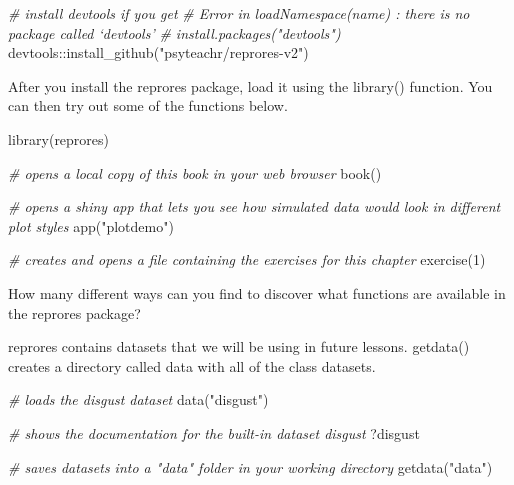 \documentclass[
  oneside]{book}
\newenvironment{Shaded}{\begin{snugshade}}{\end{snugshade}}
\newcommand{\CommentTok}[1]{\textcolor[rgb]{0.56,0.35,0.01}{\textit{#1}}}
\newcommand{\DecValTok}[1]{\textcolor[rgb]{0.00,0.00,0.81}{#1}}
\newcommand{\FunctionTok}[1]{\textcolor[rgb]{0.00,0.00,0.00}{#1}}
\newcommand{\NormalTok}[1]{#1}
\newcommand{\SpecialCharTok}[1]{\textcolor[rgb]{0.00,0.00,0.00}{#1}}
\newcommand{\StringTok}[1]{\textcolor[rgb]{0.31,0.60,0.02}{#1}}
\begin{document}
\begin{Shaded}
\begin{Highlighting}[]
\CommentTok{\# install devtools if you get}
\CommentTok{\# Error in loadNamespace(name) : there is no package called ‘devtools’}
\CommentTok{\# install.packages("devtools")}
\NormalTok{devtools}\SpecialCharTok{::}\FunctionTok{install\_github}\NormalTok{(}\StringTok{"psyteachr/reprores{-}v2"}\NormalTok{)}
\end{Highlighting}
\end{Shaded}

After you install the reprores package, load it using the {library}{(}{)} function. You can then try out some of the functions below.

\begin{Shaded}
\begin{Highlighting}[]
\FunctionTok{library}\NormalTok{(reprores)}

\CommentTok{\# opens a local copy of this book in your web browser}
\FunctionTok{book}\NormalTok{()}

\CommentTok{\# opens a shiny app that lets you see how simulated data would look in different plot styles}
\FunctionTok{app}\NormalTok{(}\StringTok{"plotdemo"}\NormalTok{)}

\CommentTok{\# creates and opens a file containing the exercises for this chapter}
\FunctionTok{exercise}\NormalTok{(}\DecValTok{1}\NormalTok{)}
\end{Highlighting}
\end{Shaded}

\begin{try}
How many different ways can you find to discover what functions are available in the reprores package?

\end{try}

reprores contains datasets that we will be using in future lessons. {getdata}{(}{)} creates a directory called data with all of the class datasets.

\begin{Shaded}
\begin{Highlighting}[]
\CommentTok{\# loads the disgust dataset}
\FunctionTok{data}\NormalTok{(}\StringTok{"disgust"}\NormalTok{)}

\CommentTok{\# shows the documentation for the built{-}in dataset \textasciigrave{}disgust\textasciigrave{}}
\NormalTok{?disgust}

\CommentTok{\# saves datasets into a "data" folder in your working directory}
\FunctionTok{getdata}\NormalTok{(}\StringTok{"data"}\NormalTok{)}
\end{Highlighting}
\end{Shaded}
\end{document}
